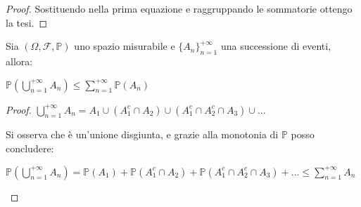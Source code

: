 \begin{theorem}
\begin{proof}
Sostituendo nella prima equazione e raggruppando le sommatorie ottengo la tesi.
\end{proof}
\end{theorem}

\begin{theorem}
    Sia $(\Omega,\mathscr{F},\mathbb{P})$ uno spazio misurabile e $\{A_n\}_{n=1}^{+\infty}$ una successione di eventi, allora:
    \begin{center}
        $\mathbb{P}(\bigcup\limits_{n=1}^{+\infty}A_n) \leq \sum\limits_{n=1}^{+\infty}\mathbb{P}(A_n)$
    \end{center}
\begin{proof}
$\bigcup\limits_{n=1}^{+\infty}A_n=A_1\cup(A_1^c\cap A_2)\cup(A_1^c\cap A_2^c\cap A_3)\cup ...$

Si osserva che è un'unione disgiunta, e grazie alla monotonia di $\mathbb{P}$ posso concludere:
\begin{center}
    $\mathbb{P}(\bigcup\limits_{n=1}^{+\infty}A_n)=\mathbb{P}(A_1)+\mathbb{P}(A_1^c\cap A_2)+\mathbb{P}(A_1^c\cap A_2^c\cap A_3)+...\leq \sum\limits_{n=1}^{+\infty}A_n$
\end{center}
\end{proof}
\end{theorem}
